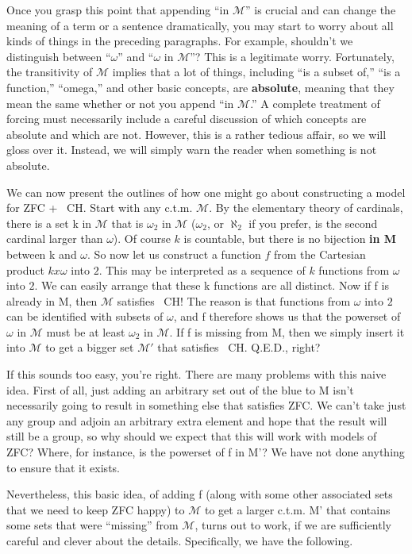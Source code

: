 \documentclass[10pt]{article}
\begin{document}
Once you grasp this point that appending ``in $\mathcal M$'' is crucial and can change the meaning of a term or a sentence dramatically, you may start to worry about all kinds of things in the preceding paragraphs. For example, shouldn't we distinguish between ``$\omega$'' and ``$\omega$ in $\mathcal M$''? This is a legitimate worry. Fortunately, the transitivity of $\mathcal{M}$ implies that a lot of things, including ``is a subset of,'' ``is a function,'' ``omega,'' and other basic concepts, are \textbf{absolute}, meaning that they mean the same whether or not you append ``in $\mathcal M$.'' A complete treatment of forcing must necessarily include a careful discussion of which concepts are absolute and which are not. However, this is a rather tedious affair, so we will gloss over it. Instead, we will simply warn the reader when something is not absolute.

We can now present the outlines of how one might go about constructing a model for ZFC + ~CH. Start with any c.t.m. $\mathcal M$. By the elementary theory of cardinals, there is a set k in $\mathcal{M}$ that is $\omega_2$ in $\mathcal{M}$ ($\omega_2$, or $\aleph_2$ if you prefer, is the second cardinal larger than $\omega$). Of course $k$ is countable, but there is no bijection \textbf{in M} between k and $\omega$. So now let us construct a function $f$ from the Cartesian product $k x \omega$ into $2$. This may be interpreted as a sequence of $k$ functions from $\omega$ into $2$. We can easily arrange that these k functions are all distinct. Now if f is already in M, then $\mathcal{M}$ satisfies ~CH! The reason is that functions from $\omega$ into $2$ can be identified with subsets of $\omega$, and f therefore shows us that the powerset of $\omega$ in $\mathcal{M}$ must be at least $\omega_2$ in $\mathcal M$. If f is missing from M, then we simply insert it into $\mathcal{M}$ to get a bigger set $\mathcal{M'}$ that satisfies ~CH. Q.E.D., right?

If this sounds too easy, you're right. There are many problems with this naive idea. First of all, just adding an arbitrary set out of the blue to M isn't necessarily going to result in something else that satisfies ZFC. We can't take just any group and adjoin an arbitrary extra element and hope that the result will still be a group, so why should we expect that this will work with models of ZFC? Where, for instance, is the powerset of f in M'? We have not done anything to ensure that it exists.

Nevertheless, this basic idea, of adding f (along with some other associated sets that we need to keep ZFC happy) to $\mathcal{M}$ to get a larger c.t.m. M' that contains some sets that were ``missing'' from $\mathcal M$, turns out to work, if we are sufficiently careful and clever about the details. Specifically, we have the following.
\end{document}
